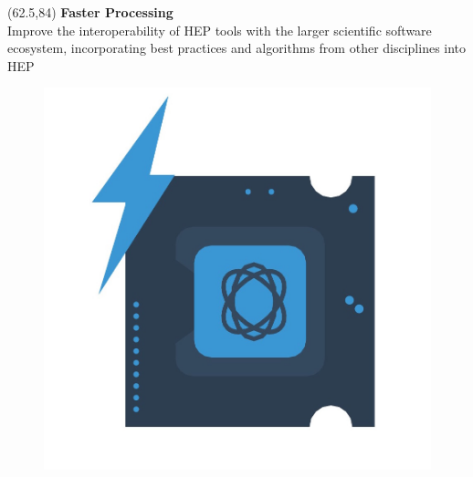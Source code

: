 \begin{textblock}{17.5}(62.5,84)
{\bf Faster Processing} \\
Improve the interoperability of HEP tools with the larger scientific software ecosystem, incorporating best practices and algorithms from other disciplines into HEP
\begin{figure}[tbph]
\centering
\includegraphics[width=1.0\textwidth]{faster-processing.jpg}
\end{figure}
\end{textblock}


